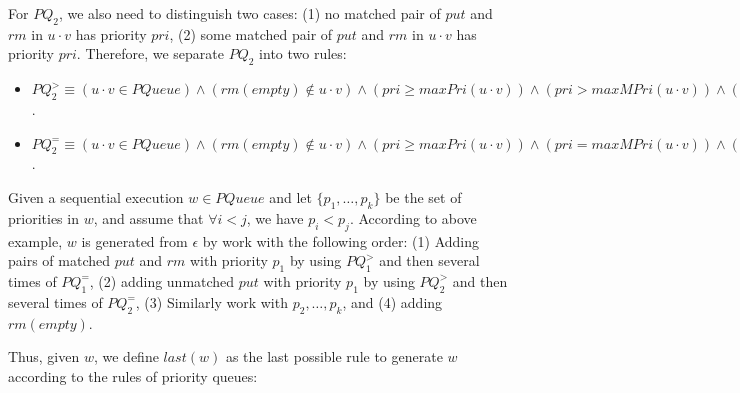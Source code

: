For $\textit{PQ}_2$, we also need to distinguish two cases: (1) no matched pair of $\textit{put}$ and $\textit{rm}$ in $u \cdot v$ has priority $\textit{pri}$, (2) some matched pair of $\textit{put}$ and $\textit{rm}$ in $u \cdot v$ has priority $\textit{pri}$. Therefore, we separate $\textit{PQ}_2$ into two rules:

\begin{itemize}
\setlength{\itemsep}{0.5pt}
\item[-] $\textit{PQ}_2^{>} \equiv (u \cdot v \in \textit{PQueue}) \wedge (\textit{rm}(\textit{empty}) \notin u \cdot v) \wedge (\textit{pri} \geq \textit{maxPri}(u \cdot v)) \wedge (\textit{pri} > \textit{maxMPri}(u \cdot v)) \wedge (\textit{putInSeq}(u \cdot v,u,\textit{pri})) \Rightarrow (u \cdot \textit{put}(\textit{itm},\textit{pri}) \cdot v \in \textit{PQueue})$.

\item[-] $\textit{PQ}_2^{=} \equiv (u \cdot v \in \textit{PQueue}) \wedge (\textit{rm}(\textit{empty}) \notin u \cdot v) \wedge (\textit{pri} \geq \textit{maxPri}(u \cdot v)) \wedge (\textit{pri} = \textit{maxMPri}(u \cdot v)) \wedge (\textit{putInSeq}(u \cdot v,u,\textit{pri})) \wedge \Rightarrow (u \cdot \textit{put}(\textit{itm},\textit{pri}) \cdot v \in \textit{PQueue})$.
\end{itemize}


Given a sequential execution $w \in \textit{PQueue}$ and let $\{p_1,\ldots,p_k\}$ be the set of priorities in $w$, and assume that $\forall i<j$, we have $p_i < p_j$. According to above example, $w$ is generated from $\epsilon$ by work with the following order: (1) Adding pairs of matched $\textit{put}$ and $\textit{rm}$ with priority $p_1$ by using $\textit{PQ}_1^{>}$ and then several times of $\textit{PQ}_1^{=}$, (2) adding unmatched $\textit{put}$ with priority $p_1$ by using $\textit{PQ}_2^{>}$ and then several times of $\textit{PQ}_2^{=}$, (3) Similarly work with $p_2,\ldots,p_k$, and (4) adding $\textit{rm}(\textit{empty})$.

Thus, given $w$, we define $\textit{last}(w)$ as the last possible rule to generate $w$ according to the rules of priority queues:

